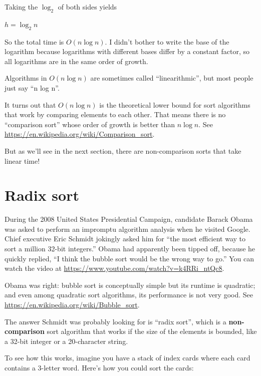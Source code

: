 \documentclass[12pt]{book}
\theoremstyle{exercise}
\newcommand{\java}{\verb}%}
\begin{document}
Taking the $\log_2$ of both sides yields

$h = \log_2 n$

So the total time is $O(n \log n)$. I didn't bother to write the
base of the logarithm because logarithms with different bases differ by
a constant factor, so all logarithms are in the same order of growth.

Algorithms in $O(n \log n)$ are sometimes called
``linearithmic'', but most people just say ``n log n''.

It turns out that $O(n \log n)$ is the theoretical lower bound for
sort algorithms that work by comparing elements to each other. That
means there is no ``comparison sort''
whose order of growth is better than $n \log n$.
See \url{https://en.wikipedia.org/wiki/Comparison_sort}.

But as we'll see in the next section, there are non-comparison sorts
that take linear time!


\section{Radix sort}
\label{radix-sort}

During the 2008 United States Presidential Campaign, candidate Barack
Obama was asked to perform an impromptu algorithm analysis when he
visited Google. Chief executive Eric Schmidt jokingly asked him for
``the most efficient way to sort a million 32-bit integers.'' Obama had
apparently been tipped off, because he quickly replied, ``I think the
bubble sort would be the wrong way to go.'' You can watch the
video at
\url{https://www.youtube.com/watch?v=k4RRi_ntQc8}.

Obama was right: bubble
sort is conceptually simple but its runtime is quadratic; and even
among quadratic sort algorithms, its performance is not very good.
See \url{https://en.wikipedia.org/wiki/Bubble_sort}.

The answer Schmidt was probably looking for is ``radix sort'', which is
a {\bf non-comparison} sort algorithm that works if the size of the
elements is bounded, like a 32-bit integer or a 20-character string.

To see how this works, imagine you have a stack of index cards where
each card contains a 3-letter word. Here's how you could sort the
cards:

\end{document}
